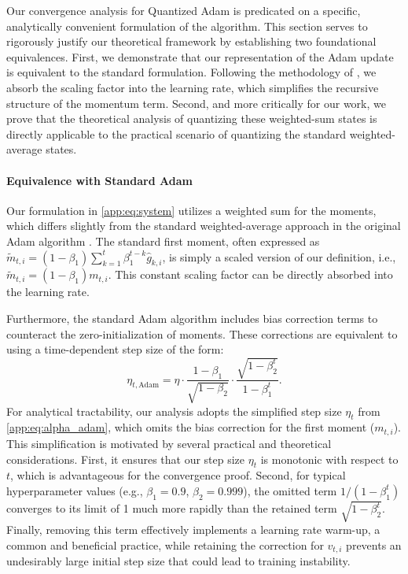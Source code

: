\documentclass[11pt, letterpaper]{article}
\begin{document}
Our convergence analysis for Quantized Adam is predicated on a specific, analytically convenient formulation of the algorithm. This section serves to rigorously justify our theoretical framework by establishing two foundational equivalences. First, we demonstrate that our representation of the Adam update is equivalent to the standard formulation. Following the methodology of \citet{defossez2022a}, we absorb the scaling factor into the learning rate, which simplifies the recursive structure of the momentum term. Second, and more critically for our work, we prove that the theoretical analysis of quantizing these weighted-sum states is directly applicable to the practical scenario of quantizing the standard weighted-average states. 

\paragraph{Equivalence with Standard Adam}
Our formulation in \eqref{app:eq:system} utilizes a weighted sum for the moments, which differs slightly from the standard weighted-average approach in the original Adam algorithm \citep{kingma2014adam}. The standard first moment, often expressed as $\tilde{m}_{t, i} = (1-\beta_1) \sum_{k=1}^{t}\beta_1^{t - k} \hat{g}_{k,i}$, is simply a scaled version of our definition, i.e., $\tilde{m}_{t,i} = (1 - \beta_1) m_{t,i}$. This constant scaling factor can be directly absorbed into the learning rate.

Furthermore, the standard Adam algorithm includes bias correction terms to counteract the zero-initialization of moments. These corrections are equivalent to using a time-dependent step size of the form:
\begin{equation}
    \label{eq:full_adam_step_size}
    \eta_{t, \text{Adam}} = \eta \cdot \frac{1 - \beta_1}{\sqrt{1 - \beta_2}} \cdot \frac{\sqrt{1 - \beta_2^t}}{1 - \beta_1^t}.
\end{equation}
For analytical tractability, our analysis adopts the simplified step size $\eta_t$ from \eqref{app:eq:alpha_adam}, which omits the bias correction for the first moment ($m_{t,i}$). This simplification is motivated by several practical and theoretical considerations. First, it ensures that our step size $\eta_t$ is monotonic with respect to $t$, which is advantageous for the convergence proof. Second, for typical hyperparameter values (e.g., $\beta_1=0.9$, $\beta_2=0.999$), the omitted term $1/(1-\beta_1^t)$ converges to its limit of 1 much more rapidly than the retained term $\sqrt{1 - \beta_2^t}$. Finally, removing this term effectively implements a learning rate warm-up, a common and beneficial practice, while retaining the correction for $v_{t,i}$ prevents an undesirably large initial step size that could lead to training instability.
\end{document}

